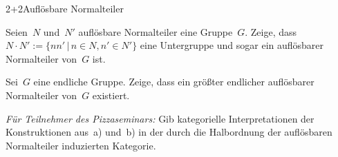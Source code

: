 \documentclass{algblatt}
\begin{document}
\begin{aufgabeE}{2+2}{Auflösbare Normalteiler}
\item Seien~$N$ und~$N'$ auflösbare Normalteiler eine Gruppe~$G$. Zeige,
dass~$N \cdot N' := \{ n n' \,|\, n \in N, n' \in N' \}$ eine Untergruppe und
sogar ein auflösbarer Normalteiler von~$G$ ist.
\item Sei~$G$ eine endliche Gruppe. Zeige, dass ein größter endlicher
auflösbarer Normalteiler von~$G$ existiert.
\tiny
\item \emph{Für Teilnehmer des Pizzaseminars:} Gib kategorielle
Interpretationen der Konstruktionen aus~a) und~b) in der durch die Halbordnung
der auflösbaren Normalteiler induzierten Kategorie.
\end{aufgabeE}
\end{document}

